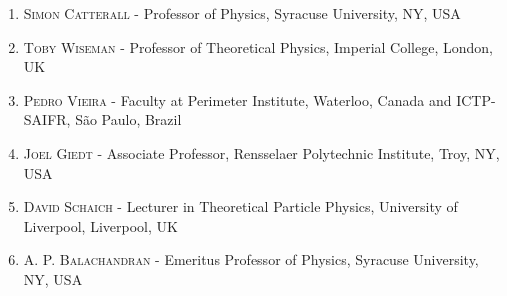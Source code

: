 

\vspace{4mm} 
\begin{enumerate} 
\item \textsc{Simon Catterall} %
- Professor of Physics, Syracuse University, NY, USA \\ 
  
\vspace{1mm} 
\item \textsc{Toby Wiseman} - Professor of Theoretical Physics, Imperial College, London, UK  \\
   
\vspace{1mm} 
\item \textsc{Pedro Vieira} - Faculty at Perimeter Institute, Waterloo, Canada and 
ICTP-SAIFR, São Paulo, Brazil  \\
  
\vspace{1mm} 
\item \textsc{Joel Giedt} - Associate Professor, Rensselaer Polytechnic Institute, Troy, NY, USA \\
 
\vspace{1mm} 
\item \textsc{David Schaich} - Lecturer in Theoretical Particle Physics, University of Liverpool, Liverpool, UK     \\                      
  
\vspace{1mm} 
\item \textsc{A. P. Balachandran} - Emeritus Professor of Physics, Syracuse University, NY, USA \\ 

\end{enumerate} 

